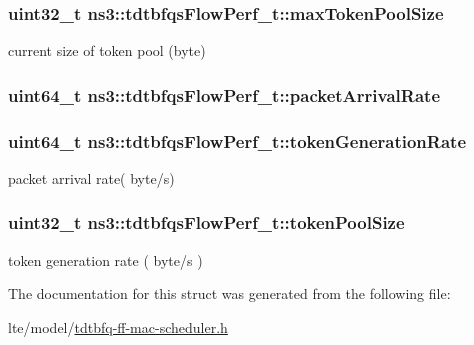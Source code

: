 \subsubsection[{\texorpdfstring{max\+Token\+Pool\+Size}{maxTokenPoolSize}}]{\setlength{\rightskip}{0pt plus 5cm}uint32\+\_\+t ns3\+::tdtbfqs\+Flow\+Perf\+\_\+t\+::max\+Token\+Pool\+Size}\hypertarget{structns3_1_1tdtbfqsFlowPerf__t_a17bdf39e867e790ec25a5e41c975316a}{}\label{structns3_1_1tdtbfqsFlowPerf__t_a17bdf39e867e790ec25a5e41c975316a}


current size of token pool (byte) 

\subsubsection[{\texorpdfstring{packet\+Arrival\+Rate}{packetArrivalRate}}]{\setlength{\rightskip}{0pt plus 5cm}uint64\+\_\+t ns3\+::tdtbfqs\+Flow\+Perf\+\_\+t\+::packet\+Arrival\+Rate}\hypertarget{structns3_1_1tdtbfqsFlowPerf__t_a7b8d68ca2862858a61d2707300e5b236}{}\label{structns3_1_1tdtbfqsFlowPerf__t_a7b8d68ca2862858a61d2707300e5b236}
\subsubsection[{\texorpdfstring{token\+Generation\+Rate}{tokenGenerationRate}}]{\setlength{\rightskip}{0pt plus 5cm}uint64\+\_\+t ns3\+::tdtbfqs\+Flow\+Perf\+\_\+t\+::token\+Generation\+Rate}\hypertarget{structns3_1_1tdtbfqsFlowPerf__t_a9957bcf92996d008cd8752debbe8385a}{}\label{structns3_1_1tdtbfqsFlowPerf__t_a9957bcf92996d008cd8752debbe8385a}


packet arrival rate( byte/s) 

\subsubsection[{\texorpdfstring{token\+Pool\+Size}{tokenPoolSize}}]{\setlength{\rightskip}{0pt plus 5cm}uint32\+\_\+t ns3\+::tdtbfqs\+Flow\+Perf\+\_\+t\+::token\+Pool\+Size}\hypertarget{structns3_1_1tdtbfqsFlowPerf__t_a0018ebbc62638f00f2b65dea4175acc4}{}\label{structns3_1_1tdtbfqsFlowPerf__t_a0018ebbc62638f00f2b65dea4175acc4}


token generation rate ( byte/s ) 



The documentation for this struct was generated from the following file\+:\begin{DoxyCompactItemize}
\item 
lte/model/\hyperlink{lte_2model_2tdtbfq-ff-mac-scheduler_8h}{tdtbfq-\/ff-\/mac-\/scheduler.\+h}\end{DoxyCompactItemize}
